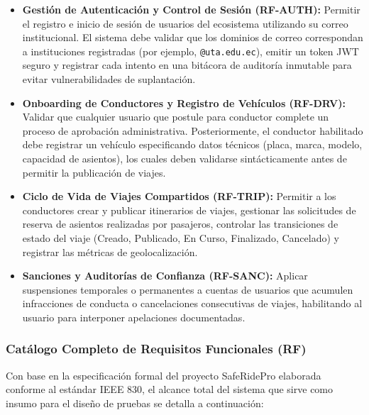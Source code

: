 \documentclass{article}
\begin{document}
\begin{itemize}
    \item \textbf{Gestión de Autenticación y Control de Sesión (RF-AUTH):} Permitir el registro e inicio de sesión de usuarios del ecosistema utilizando su correo institucional. El sistema debe validar que los dominios de correo correspondan a instituciones registradas (por ejemplo, \texttt{@uta.edu.ec}), emitir un token JWT seguro y registrar cada intento en una bitácora de auditoría inmutable para evitar vulnerabilidades de suplantación.
    \item \textbf{Onboarding de Conductores y Registro de Vehículos (RF-DRV):} Validar que cualquier usuario que postule para conductor complete un proceso de aprobación administrativa. Posteriormente, el conductor habilitado debe registrar un vehículo especificando datos técnicos (placa, marca, modelo, capacidad de asientos), los cuales deben validarse sintácticamente antes de permitir la publicación de viajes.
    \item \textbf{Ciclo de Vida de Viajes Compartidos (RF-TRIP):} Permitir a los conductores crear y publicar itinerarios de viajes, gestionar las solicitudes de reserva de asientos realizadas por pasajeros, controlar las transiciones de estado del viaje (Creado, Publicado, En Curso, Finalizado, Cancelado) y registrar las métricas de geolocalización.
    \item \textbf{Sanciones y Auditorías de Confianza (RF-SANC):} Aplicar suspensiones temporales o permanentes a cuentas de usuarios que acumulen infracciones de conducta o cancelaciones consecutivas de viajes, habilitando al usuario para interponer apelaciones documentadas.
\end{itemize}

\subsubsection*{Catálogo Completo de Requisitos Funcionales (RF)}
Con base en la especificación formal del proyecto SafeRidePro elaborada conforme al estándar IEEE 830, el alcance total del sistema que sirve como insumo para el diseño de pruebas se detalla a continuación:
\end{document}
